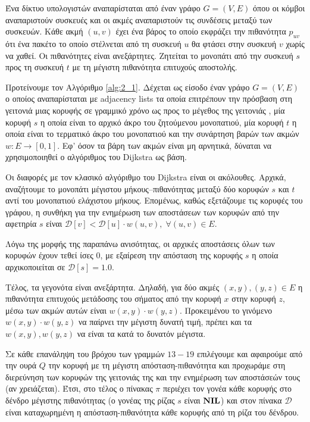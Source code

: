 \begin{problem}
	\label{problem_1}
	Ένα δίκτυο υπολογιστών αναπαρίσταται από έναν γράφο $G = (V, E)$ όπου οι κόμβοι αναπαριστούν συσκευές και οι ακμές αναπαριστούν τις συνδέσεις μεταξύ των συσκευών. Κάθε ακμή $(u, v)$ έχει ένα βάρος το οποίο εκφράζει την πιθανότητα $p_{uv}$ ότι ένα πακέτο το οποίο στέλνεται από τη συσκευή $u$ θα φτάσει στην συσκευή $v$ χωρίς να χαθεί. Οι πιθανότητες είναι ανεξάρτητες. Ζητείται το μονοπάτι από την συσκευή $s$ προς τη συσκευή $t$ με τη μέγιστη πιθανότητα επιτυχούς αποστολής.
\end{problem}
\vspace{-6pt}\par
Προτείνουμε τον Αλγόριθμο \ref{alg:2_1}. Δέχεται ως είσοδο έναν γράφο $G=(V,E)$ ο οποίος αναπαρίσταται με adjacency lists τα οποία επιτρέπουν την πρόσβαση στη γειτονιά μιας κορυφής σε γραμμικό χρόνο ως προς το μέγεθος της γειτονιάς , μία κορυφή $s$ η οποία είναι το αρχικό άκρο του ζητούμενου μονοπατιού, μία κορυφή $t$ η οποία είναι το τερματικό άκρο του μονοπατιού και την συνάρτηση βαρών των ακμών $w:E\to[0,1]$. Εφ' όσον τα βάρη των ακμών είναι μη αρνητικά, δύναται να χρησιμοποιηθεί ο αλγόριθμος του Dijkstra ως βάση.\par
Οι διαφορές με τον κλασικό αλγόριθμο του Dijkstra είναι οι ακόλουθες. Αρχικά, αναζήτουμε το μονοπάτι μέγιστου μήκους--πιθανότητας μεταξύ δύο κορυφών $s$ και $t$ αντί του μονοπατιού ελάχιστου μήκους. Επομένως, καθώς εξετάζουμε τις κορυφές του γράφου, η συνθήκη για την ενημέρωση των αποστάσεων των κορυφών από την αφετηρία $s$ είναι $\mathcal{D}[v]<\mathcal{D}[u]\cdot w(u,v),\;\forall(u,v)\in E$.\par
Λόγω της μορφής της παραπάνω ανισότητας, οι αρχικές αποστάσεις όλων των κορυφών έχουν τεθεί ίσες $0$, με εξαίρεση την απόσταση της κορυφής $s$ η οποία αρχικοποιείται σε $\mathcal{D}[s]=1.0$.\par
Τέλος, τα γεγονότα είναι ανεξάρτητα. Δηλαδή, για δύο ακμές $(x,y),(y,z)\in E$ η πιθανότητα επιτυχούς μετάδοσης του σήματος από την κορυφή $x$ στην κορυφή $z$, μέσω των ακμών αυτών είναι $w(x,y)\cdot w(y,z)$. Προκειμένου το γινόμενο $w(x,y)\cdot w(y,z)$ να παίρνει την μέγιστη δυνατή τιμή, πρέπει και τα $w(x,y),w(y,z)$ να είναι τα κατά το δυνατόν μέγιστα.\par
Σε κάθε επανάληψη του βρόχου των γραμμών $13-19$ επιλέγουμε και αφαιρούμε από την ουρά $Q$ την κορυφή με τη μέγιστη απόσταση-πιθανότητα και προχωράμε στη διερεύνηση των κορυφών της γειτονιάς της και την ενημέρωση των αποστάσεών τους (αν χρειάζεται). Έτσι, στο τέλος ο πίνακας $\pi$ περιέχει τον γονέα κάθε κορυφής στο δένδρο μέγιστης πιθανότητας (ο γονέας της ρίζας $s$ είναι ${\textbf{NIL}}$) και στον πίνακα $\mathcal{D}$ είναι καταχωρημένη η απόσταση-πιθανότητα κάθε κορυφής από τη ρίζα του δένδρου.\par

